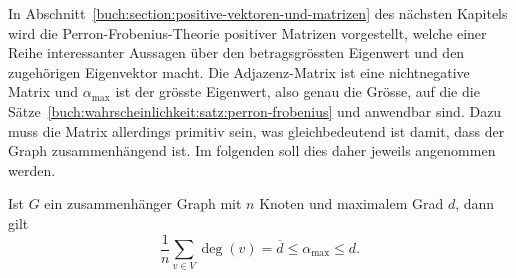In Abschnitt~\ref{buch:section:positive-vektoren-und-matrizen}
des nächsten Kapitels wird die Perron-Frobenius-Theorie positiver
Matrizen vorgestellt, welche einer Reihe interessanter Aussagen
über den betragsgrössten Eigenwert und den zugehörigen Eigenvektor
macht.
Die Adjazenz-Matrix ist eine nichtnegative Matrix und $\alpha_{\text{max}}$
ist der grösste Eigenwert, also genau die Grösse, auf die die
Sätze~\ref{buch:wahrscheinlichkeit:satz:perron-frobenius}
und \label{buch:wahrscheinlichkeit:satz:perron-frobenius2}
anwendbar sind.
Dazu muss die Matrix allerdings primitiv sein, was gleichbedeutend
ist damit, dass der Graph zusammenhängend ist.
Im folgenden soll dies daher jeweils angenommen werden.

\begin{satz}
Ist $G$ ein zusammenhänger Graph mit $n$ Knoten und maximalem Grad $d$,
dann gilt
\[
\frac1n\sum_{v\in V} \deg(v) 
=
\overline{d}
\le \alpha_{\text{max}} \le d.
\]
\end{satz}

